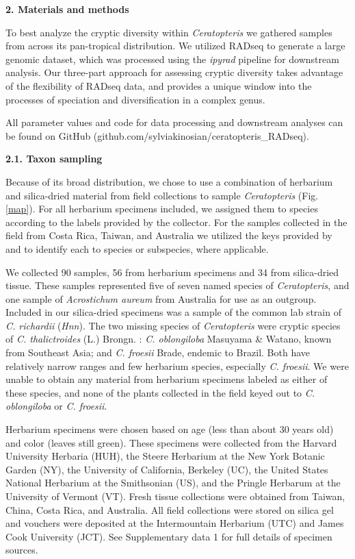 \documentclass[12pt]{article}
\begin{document}
\begin{flushleft}
\vspace{1cm}

{\large\textbf{2. Materials and methods}}

To best analyze the cryptic diversity within \textit{Ceratopteris} we gathered samples from across its pan-tropical distribution. We utilized RADseq to generate a large genomic dataset, which was processed using the \textit{ipyrad} pipeline \autocite{Eaton2020} for downstream analysis. Our three-part approach for assessing cryptic diversity takes advantage of the flexibility of RADseq data, and provides a unique window into the processes of speciation and diversification in a complex genus. 

All parameter values and code for data processing and downstream analyses can be found on GitHub (github.com/sylviakinosian/ceratopteris\_RADseq).

\textbf{2.1. Taxon sampling}

Because of its broad distribution, we chose to use a combination of herbarium and silica-dried material from field collections to sample \textit{Ceratopteris} (Fig. \ref{map}). For all herbarium specimens included, we assigned them to species according to the labels provided by the collector. For the samples collected in the field from Costa Rica, Taiwan, and Australia we utilized the keys provided by \textcite{LloydTax1974} and \textcite{Masuyama2010} to identify each to species or subspecies, where applicable. 

We collected 90 samples, 56 from herbarium specimens and 34 from silica-dried tissue. These samples represented five of seven named species of \textit{Ceratopteris}, and one sample of \textit{Acrostichum aureum} from Australia for use as an outgroup. Included in our silica-dried specimens was a sample of the common lab strain of \textit{C. richardii} (\textit{Hnn}). The two missing species of \textit{Ceratopteris} were cryptic species of \textit{C. thalictroides} (L.) Brongn. \autocite{Masuyama2010}: \textit{C. oblongiloba} Masuyama \& Watano, known from Southeast Asia; and \textit{C. froesii} Brade, endemic to Brazil. Both have relatively narrow ranges and few herbarium species, especially \textit{C. froesii}. We were unable to obtain any material from herbarium specimens labeled as either of these species, and none of the plants collected in the field keyed out to \textit{C. oblongiloba} or \textit{C. froesii}. 

Herbarium specimens were chosen based on age (less than about 30 years old) and color (leaves still green). These specimens were collected from the Harvard University Herbaria (HUH), the Steere Herbarium at the New York Botanic Garden (NY), the University of California, Berkeley (UC), the United States National Herbarium at the Smithsonian (US), and the Pringle Herbarum at the University of Vermont (VT). Fresh tissue collections were obtained from Taiwan, China, Costa Rica, and Australia. All field collections were stored on silica gel and vouchers were deposited at the Intermountain Herbarium (UTC) and James Cook University (JCT). See Supplementary data 1 for full details of specimen sources.


\end{flushleft}
\end{document}
